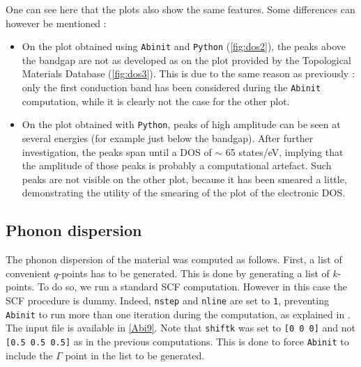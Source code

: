 \documentclass[11pt,a4paper]{article}
\begin{document}
One can see here that the plots also show the same features. Some differences can however be mentioned : 
\begin{itemize}
\item On the plot obtained using \texttt{Abinit} and \texttt{Python} (\autoref{fig:dos2}), the peaks above the bandgap are not as developed as on the plot provided by the Topological Materials Database (\autoref{fig:dos3}). This is due to the same reason as previously : only the first conduction band has been considered during the \texttt{Abinit} computation, while it is clearly not the case for the other plot. 
\item On the plot obtained with \texttt{Python}, peaks of high amplitude can be seen at several energies (for example just below the bandgap). After further investigation, the peaks span until a DOS of $\sim$ 65 states/eV, implying that the amplitude of those peaks is probably a computational artefact. Such peaks are not visible on the other plot, because it has been smeared a little, demonstrating the utility of the smearing of the plot of the electronic DOS.
\end{itemize}
\subsection{Phonon dispersion}
The phonon dispersion of the material was computed as follows. First, a list of convenient $q$-points has to be generated. This is done by generating a list of $k$-points. To do so, we run a standard SCF computation. However in this case the SCF procedure is dummy. Indeed, \texttt{nstep} and \texttt{nline} are set to \texttt{1}, preventing \texttt{Abinit} to run more than one iteration during the computation, as explained in \cite{tutoPhonons}. The input file is available in \autoref{Abi9}. Note that \texttt{shiftk} was set to \texttt{[0 0 0]} and not \texttt{[0.5 0.5 0.5]} as in the previous computations. This is done to force \texttt{Abinit} to include the $\Gamma$ point in the list to be generated.
\end{document}
